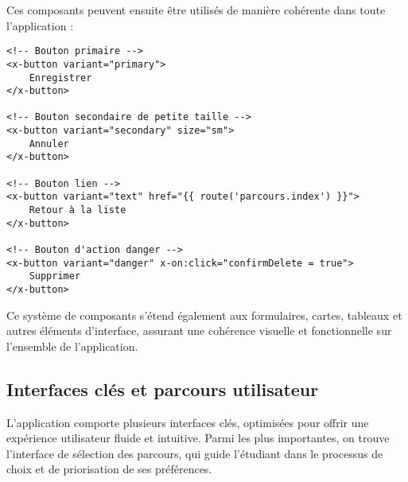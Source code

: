 \documentclass[french,12pt]{report} %
\begin{document}
Ces composants peuvent ensuite être utilisés de manière cohérente dans toute l'application :

\begin{lstlisting}[style=htmlstyle,caption={Utilisation des composants de bouton dans les vues}]
<!-- Bouton primaire -->
<x-button variant="primary">
    Enregistrer
</x-button>

<!-- Bouton secondaire de petite taille -->
<x-button variant="secondary" size="sm">
    Annuler
</x-button>

<!-- Bouton lien -->
<x-button variant="text" href="{{ route('parcours.index') }}">
    Retour à la liste
</x-button>

<!-- Bouton d'action danger -->
<x-button variant="danger" x-on:click="confirmDelete = true">
    Supprimer
</x-button>
\end{lstlisting}

Ce système de composants s'étend également aux formulaires, cartes, tableaux et autres éléments d'interface, assurant une cohérence visuelle et fonctionnelle sur l'ensemble de l'application.

\subsection{Interfaces clés et parcours utilisateur}

L'application comporte plusieurs interfaces clés, optimisées pour offrir une expérience utilisateur fluide et intuitive. Parmi les plus importantes, on trouve l'interface de sélection des parcours, qui guide l'étudiant dans le processus de choix et de priorisation de ses préférences.
\end{document}
